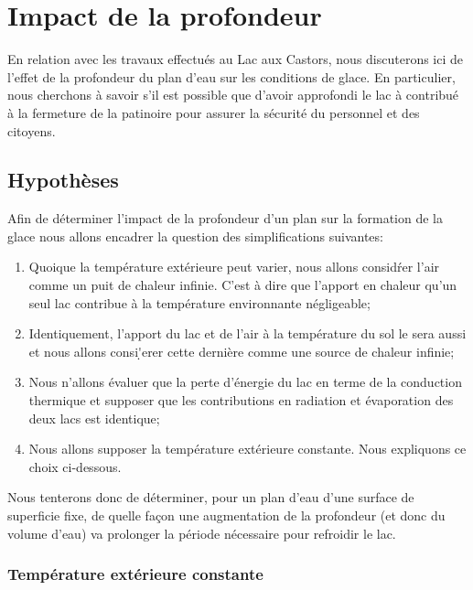 \documentclass[12pt]{article}
\begin{document}
\section{Impact de la profondeur}

En relation avec les travaux effectu\'es au Lac aux Castors, nous discuterons ici de l'effet de la
profondeur du plan d'eau sur les conditions de glace. En particulier, nous cherchons \`a savoir s'il est
possible que d'avoir approfondi\cite{Lac} le lac \`a contribu\'e \`a la fermeture de la patinoire pour
assurer la s\'ecurit\'e du personnel et des citoyens.

\subsection{Hypoth\`eses}

Afin de d\'eterminer l'impact de la profondeur d'un plan sur la formation de la glace nous allons
encadrer la question des simplifications suivantes:

\begin{enumerate}
    \item Quoique la temp\'erature ext\'erieure peut varier, nous allons consid\'rer l'air comme un puit
        de chaleur infinie. C'est \`a dire que l'apport en chaleur qu'un seul lac contribue \`a la temp\'erature
        environnante n\'egligeable;
    \item Identiquement, l'apport du lac et de l'air \`a la temp\'erature du sol le sera aussi et nous
        allons consi\d'erer cette derni\`ere comme une source de chaleur infinie;
    \item Nous n'allons \'evaluer que la perte d'\'energie du lac en terme de la conduction thermique et
        supposer que les contributions en radiation et \'evaporation des deux lacs est identique;
    \item Nous allons supposer la temp\'erature ext\'erieure constante. Nous expliquons ce choix
        ci-dessous.
\end{enumerate}

Nous tenterons donc de d\'eterminer, pour un plan d'eau d'une surface de superficie fixe, de quelle fa\c
con une augmentation de la profondeur (et donc du volume d'eau) va prolonger la p\'eriode n\'ecessaire
pour refroidir le lac.

\subsubsection{Temp\'erature ext\'erieure constante}
\end{document}
